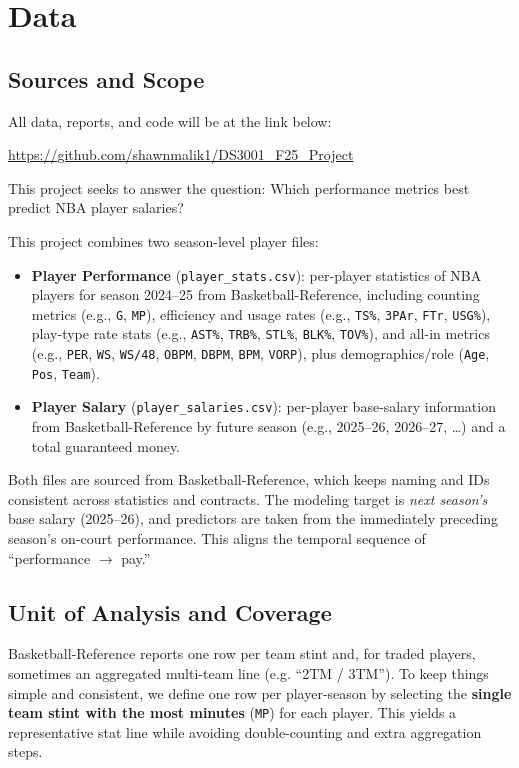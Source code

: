 \documentclass{article}
\theoremstyle{plain}
\theoremstyle{definition}
\theoremstyle{remark}
\begin{document}

\section{Data}
\label{sec:data}

\subsection*{Sources and Scope}
All data, reports, and code will be at the link below:

\url{https://github.com/shawnmalik1/DS3001_F25_Project}

This project seeks to answer the question: Which performance metrics best predict NBA player salaries?

This project combines two season-level player files:
\begin{itemize}
    \item \textbf{Player Performance} (\texttt{player\_stats.csv}): per-player statistics of NBA players for season 2024--25 from Basketball-Reference, including counting metrics (e.g., \texttt{G}, \texttt{MP}), efficiency and usage rates (e.g., \texttt{TS\%}, \texttt{3PAr}, \texttt{FTr}, \texttt{USG\%}), play-type rate stats (e.g., \texttt{AST\%}, \texttt{TRB\%}, \texttt{STL\%}, \texttt{BLK\%}, \texttt{TOV\%}), and all-in metrics (e.g., \texttt{PER}, \texttt{WS}, \texttt{WS/48}, \texttt{OBPM}, \texttt{DBPM}, \texttt{BPM}, \texttt{VORP}), plus demographics/role (\texttt{Age}, \texttt{Pos}, \texttt{Team}).
    
    \item \textbf{Player Salary} (\texttt{player\_salaries.csv}): per-player base-salary information from Basketball-Reference by future season (e.g., 2025--26, 2026--27, \ldots) and a total guaranteed money.
\end{itemize}

Both files are sourced from Basketball-Reference, which keeps naming and IDs consistent across statistics and contracts.
The modeling target is \emph{next season's} base salary (2025--26), and predictors are taken from the immediately preceding season's on-court performance. This aligns the temporal sequence of ``performance $\rightarrow$ pay.''

\subsection*{Unit of Analysis and Coverage}
Basketball-Reference reports one row per team stint and, for traded players, sometimes an aggregated multi-team line (e.g. ``2TM / 3TM''). To keep things simple and consistent, we define one row per player-season by selecting the \textbf{single team stint with the most minutes} (\texttt{MP}) for each player. This yields a representative stat line while avoiding double-counting and extra aggregation steps.
\end{document}
